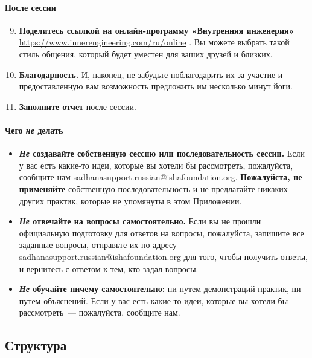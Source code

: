 \paragraph{После сессии}
\begin{enumerate}
    \setcounter{enumi}{8}
\item \textbf{Поделитесь ссылкой на онлайн-программу «Внутренняя инженерия»}
  \href{https://www.innerengineering.com/ru/online}{https://www.innerengineering.com/ru/online} \faSmileO. Вы можете выбрать такой стиль общения, который будет уместен для ваших друзей и близких.
    \item \textbf{Благодарность.} И, наконец, не забудьте поблагодарить их за участие и предоставленную вам возможность предложить им несколько минут йоги.
    \item \textbf{Заполните \href{https://forms.gle/q1N7jG4vBEWBmng86}{отчет}} после сессии. 
\end{enumerate}

\paragraph{Чего \emph{не} делать}
\begin{itemize}
    \item[\faRemove] \textbf{\emph{Не} создавайте собственную сессию или последовательность сессии.} Если у вас есть какие-то идеи, которые вы хотели бы рассмотреть, пожалуйста, сообщите нам sadhanasupport.russian@ishafoundation.org. \textbf{Пожалуйста, не применяйте} собственную последовательность и не предлагайте никаких других практик, которые не упомянуты в этом Приложении.
    \item[\faRemove] \textbf{\emph{Не} отвечайте на вопросы самостоятельно.} Если вы не прошли официальную подготовку для ответов на вопросы, пожалуйста, запишите все заданные вопросы, отправьте их по адресу sadhanasupport.russian@ishafoundation.org для того, чтобы получить ответы, и вернитесь с ответом к тем, кто задал вопросы.
    \item[\faRemove] \textbf{\emph{Не} обучайте ничему самостоятельно:} ни путем демонстраций практик, ни путем объяснений. Если у вас есть какие-то идеи, которые вы хотели бы рассмотреть~--- пожалуйста, сообщите нам.
\end{itemize}

\subsection*{Структура}
\label{sec:struct}

